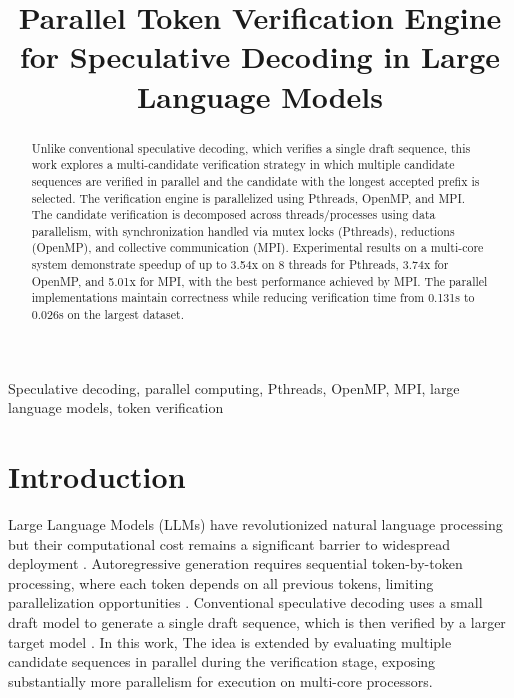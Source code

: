 \documentclass[conference]{IEEEtran}
\begin{document}
\title{Parallel Token Verification Engine for Speculative Decoding in Large Language Models}

\author{
}

\maketitle

\begin{abstract}
Unlike conventional speculative decoding, which verifies a single draft sequence, this work explores a multi-candidate verification strategy in which multiple candidate sequences are verified in parallel and the candidate with the longest accepted prefix is selected. The verification engine is parallelized using Pthreads, OpenMP, and MPI. The candidate verification is decomposed across threads/processes using data parallelism, with synchronization handled via mutex locks (Pthreads), reductions (OpenMP), and collective communication (MPI). Experimental results on a multi-core system demonstrate speedup of up to 3.54x on 8 threads for Pthreads, 3.74x for OpenMP, and 5.01x for MPI, with the best performance achieved by MPI. The parallel implementations maintain correctness while reducing verification time from 0.131s to 0.026s on the largest dataset.
\end{abstract}

\begin{IEEEkeywords}
Speculative decoding, parallel computing, Pthreads, OpenMP, MPI, large language models, token verification
\end{IEEEkeywords}

\section{Introduction}

Large Language Models (LLMs) have revolutionized natural language processing but their computational cost remains a significant barrier to widespread deployment \cite{brown2020}. Autoregressive generation requires sequential token-by-token processing, where each token depends on all previous tokens, limiting parallelization opportunities \cite{vaswani2017}. Conventional speculative decoding uses a small draft model to generate a single draft sequence, which is then verified by a larger target model \cite{chen2023}. In this work, The idea is extended by evaluating multiple candidate sequences in parallel during the verification stage, exposing substantially more parallelism for execution on multi-core processors.
\end{document}
